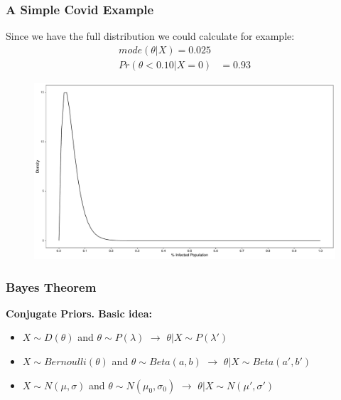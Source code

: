 \documentclass[
  shownotes,
  xcolor={svgnames},
  hyperref={colorlinks,citecolor=DarkBlue,linkcolor=DarkRed,urlcolor=DarkBlue}
  ]{beamer}
\begin{document}
\begin{frame}[fragile]
\frametitle{A Simple Covid Example}

Since we have the full distribution we could calculate for example:
\begin{align}
mode(\theta|X) = 0.025 \\
Pr(\theta<0.10|X=0) &= 0.93
\end{align}

\begin{figure}[H] \centering
  \centering
  \includegraphics[scale=0.25]{figures/fig_2}
  \\
  \tiny 
\end{figure}


\end{frame}

\begin{frame}
\frametitle{Bayes Theorem}
{\bf Conjugate Priors. Basic idea:}

\bigskip
\begin{itemize}
  \item $X\sim D(\theta)$ and $\theta \sim P(\lambda)$ $\rightarrow$ $\theta|X \sim P(\lambda')$
  \bigskip
  \item  $X\sim Bernoulli(\theta)$ and $\theta \sim Beta(a,b)$ $\rightarrow$ $\theta|X \sim Beta(a',b')$
  \bigskip
  \item  $X\sim N(\mu,\sigma)$ and $\theta \sim N(\mu_0,\sigma_0)$ $\rightarrow$ $\theta|X \sim N(\mu',\sigma')$
\end{itemize}

\end{frame}


\end{document}
